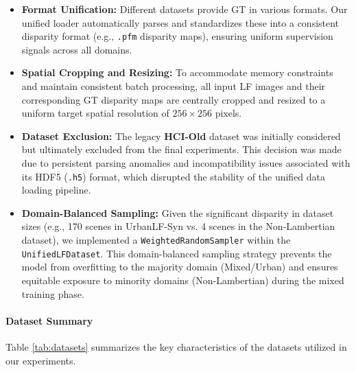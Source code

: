 \documentclass[lettersize,journal]{IEEEtran}
\begin{document}
\begin{itemize}
\item \textbf{Format Unification:} Different datasets provide GT in various formats. Our unified loader automatically parses and standardizes these into a consistent disparity format (e.g., \texttt{.pfm} disparity maps), ensuring uniform supervision signals across all domains.
\item \textbf{Spatial Cropping and Resizing:} To accommodate memory constraints and maintain consistent batch processing, all input LF images and their corresponding GT disparity maps are centrally cropped and resized to a uniform target spatial resolution of $256 \times 256$ pixels.
\item \textbf{Dataset Exclusion:} The legacy \textbf{HCI-Old} dataset was initially considered but ultimately excluded from the final experiments. This decision was made due to persistent parsing anomalies and incompatibility issues associated with its HDF5 (\texttt{.h5}) format, which disrupted the stability of the unified data loading pipeline.
\item \textbf{Domain-Balanced Sampling:} Given the significant disparity in dataset sizes (e.g., 170 scenes in UrbanLF-Syn vs. 4 scenes in the Non-Lambertian dataset), we implemented a \texttt{WeightedRandomSampler} within the \texttt{UnifiedLFDataset}. This domain-balanced sampling strategy prevents the model from overfitting to the majority domain (Mixed/Urban) and ensures equitable exposure to minority domains (Non-Lambertian) during the mixed training phase.
\end{itemize}

\paragraph{Dataset Summary}

Table \ref{tab:datasets} summarizes the key characteristics of the datasets utilized in our experiments.
\end{document}
